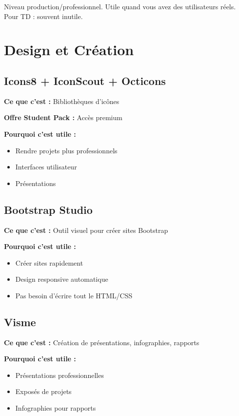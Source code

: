 \documentclass[11pt,a4paper]{article}
\begin{document}
\begin{conseil}
Niveau production/professionnel. Utile quand vous avez des utilisateurs réels. Pour TD : souvent inutile.
\end{conseil}

\newpage
\section{Design et Création}

\subsection{Icons8 + IconScout + Octicons}

\textbf{Ce que c'est :} Bibliothèques d'icônes

\textbf{Offre Student Pack :} Accès premium

\textbf{Pourquoi c'est utile :}
\begin{itemize}
    \item Rendre projets plus professionnels
    \item Interfaces utilisateur
    \item Présentations
\end{itemize}

\subsection{Bootstrap Studio}

\textbf{Ce que c'est :} Outil visuel pour créer sites Bootstrap

\textbf{Pourquoi c'est utile :}
\begin{itemize}
    \item Créer sites rapidement
    \item Design responsive automatique
    \item Pas besoin d'écrire tout le HTML/CSS
\end{itemize}

\subsection{Visme}

\textbf{Ce que c'est :} Création de présentations, infographies, rapports

\textbf{Pourquoi c'est utile :}
\begin{itemize}
    \item Présentations professionnelles
    \item Exposés de projets
    \item Infographies pour rapports
\end{itemize}
\end{document}
